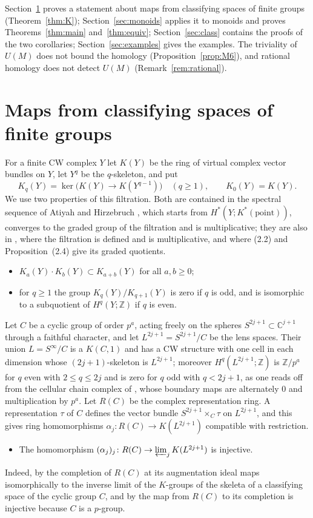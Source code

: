 \documentclass[11pt,a4paper]{article}
\theoremstyle{definition}
\newcommand{\Z}{\mathbb{Z}}
\newcommand{\CC}{\mathbb{C}}
\newcommand{\sk}[2]{#1^{#2}}
\begin{document}
Section~\ref{sec:K} proves a statement about maps from classifying spaces of
finite groups (Theorem~\ref{thm:K}); Section~\ref{sec:monoids} applies it to
monoids and proves Theorems~\ref{thm:main} and~\ref{thm:equiv};
Section~\ref{sec:class} contains the proofs of the two corollaries;
Section~\ref{sec:examples} gives the examples. The triviality of $U(M)$ does
not bound the homology (Proposition~\ref{prop:M6}), and rational homology
does not detect $U(M)$ (Remark~\ref{rem:rational}).

\section{Maps from classifying spaces of finite groups}\label{sec:K}

For a finite CW complex $Y$ let $K(Y)$ be the ring of virtual complex vector
bundles on $Y$, let $\sk{Y}{q}$ be the $q$-skeleton, and put
\[
 K_q(Y)=\ker\bigl(K(Y)\to K(\sk{Y}{q-1})\bigr)\quad(q\ge1),\qquad K_0(Y)=K(Y).
\]
We use two properties of this filtration. Both are contained in the spectral
sequence of Atiyah and Hirzebruch \cite[\S2]{AH}, which starts from
$H^*(Y;K^*(\mathrm{point}))$, converges to the graded group of the filtration
and is multiplicative; they are also in \cite[\S2]{At}, where the filtration
is defined and is multiplicative, and where (2.2) and Proposition~(2.4) give
its graded quotients.
\begin{itemize}
\item[(K1)] $K_a(Y)\cdot K_b(Y)\subset K_{a+b}(Y)$ for all $a,b\ge0$;
\item[(K2)] for $q\ge1$ the group $K_q(Y)/K_{q+1}(Y)$ is zero if $q$ is odd,
and is isomorphic to a subquotient of $H^q(Y;\Z)$ if $q$ is even.
\end{itemize}

Let $C$ be a cyclic group of order $p^a$, acting freely on the spheres
$S^{2j+1}\subset\CC^{j+1}$ through a faithful character, and let
$\sk{L}{2j+1}=S^{2j+1}/C$ be the lens spaces. Their union $L=S^\infty/C$ is a
$K(C,1)$ and has a CW structure with one cell in each dimension whose
$(2j+1)$-skeleton is $\sk{L}{2j+1}$; moreover $H^q(\sk{L}{2j+1};\Z)$ is
$\Z/p^a$ for $q$ even with $2\le q\le2j$ and is zero for $q$ odd with
$q<2j+1$, as one reads off from the cellular chain complex of
\cite[Example~2.43]{Ha}, whose boundary maps are alternately $0$ and
multiplication by $p^a$. Let $R(C)$ be the complex representation
ring. A representation $\tau$ of $C$ defines the vector bundle
$S^{2j+1}\times_C\tau$ on $\sk{L}{2j+1}$, and this gives ring homomorphisms
$\alpha_j\colon R(C)\to K(\sk{L}{2j+1})$ compatible with restriction.
\begin{itemize}
\item[(K3)] The homomorphism
$(\alpha_j)_j\colon R(C)\to\varprojlim_jK(\sk{L}{2j+1})$ is injective.
\end{itemize}
Indeed, by \cite[Proposition~(8.1)]{At} the completion of $R(C)$ at its
augmentation ideal maps isomorphically to the inverse limit of the $K$-groups
of the skeleta of a classifying space of the cyclic group $C$, and by
\cite[Proposition~(6.11)]{At} the map from $R(C)$ to its completion is
injective because $C$ is a $p$-group.
\end{document}
